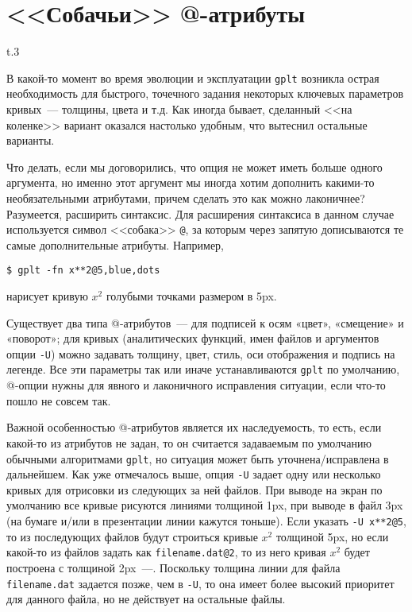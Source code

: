 \documentclass[12pt]{article}
\def\gplt{{\tt gplt}}
\begin{document}
\section{<<Собачьи>> @-атрибуты}\label{dog:attr:sec}
\begin{wrapfigure}[5]{t}{.3\textwidth}
  \vphantom{.}
  \vspace{-2.5cm}

\end{wrapfigure}
В какой-то момент во время эволюции и эксплуатации \verb'gplt' возникла острая необходимость для быстрого, точечного задания некоторых ключевых
параметров кривых~--- толщины, цвета и т.д. Как иногда бывает, сделанный <<на коленке>> вариант
оказался настолько удобным, что вытеснил остальные варианты. 

Что делать, если мы договорились, что опция не может иметь больше одного аргумента, но именно этот аргумент мы иногда хотим дополнить какими-то необязательными атрибутами,
причем сделать это как можно лаконичнее?
Разумеется, расширить синтаксис. Для расширения синтаксиса в данном случае используется символ <<собака>> \verb'@', за которым через запятую дописываются те самые
дополнительные атрибуты. Например,
\begin{verbatim}
$ gplt -fn x**2@5,blue,dots
\end{verbatim}
нарисует кривую $x^2$ голубыми точками размером в 5px.

Существует два типа @-атрибутов~--- для подписей к осям «цвет», «смещение» и «поворот»; для кривых (аналитических функций,
имен файлов и аргументов опции \verb'-U') можно задавать толщину, цвет, стиль, оси отображения и подпись на легенде.
Все эти параметры так или иначе устанавливаются \gplt{} по умолчанию, @-опции нужны для явного и лаконичного исправления ситуации, если что-то пошло не совсем так. 

Важной особенностью @-атрибутов является их наследуемость, то есть, если какой-то из атрибутов не задан, то он считается задаваемым по умолчанию
обычными алгоритмами \gplt, но ситуация может быть уточнена/исправлена в дальнейшем.
Как уже отмечалось выше, опция \verb'-U' задает одну или несколько кривых для отрисовки из следующих за ней файлов. При выводе на экран по умолчанию
все кривые рисуются линиями толщиной 1px, при выводе в файл 3px (на бумаге и/или в презентации линии кажутся тоньше).
Если указать \verb'-U x**2@5', то из последующих файлов будут строиться кривые $x^2$ толщиной 5px, но если какой-то из файлов задать как
\verb'filename.dat@2', то из него кривая $x^2$ будет построена с толщиной 2px~---. Поскольку толщина линии для файла \verb'filename.dat' задается позже, чем в \verb'-U',
то она имеет более высокий приоритет для данного файла, но не действует на остальные файлы. 
\end{document}
